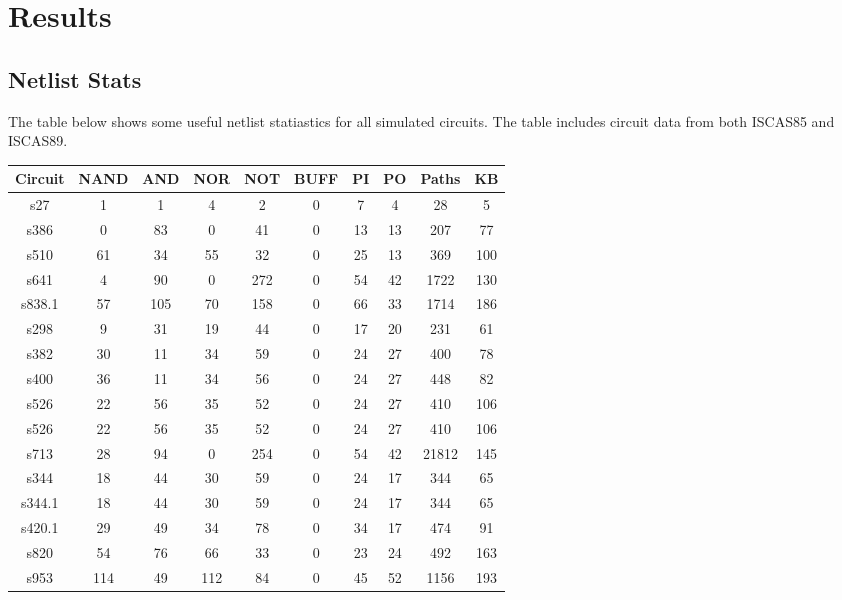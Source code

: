 \documentclass[a4paper,11pt]{article}
\begin{document}
\clearpage 

\section*{Results}

\subsection*{Netlist Stats}

The table below shows some useful netlist statiastics for all simulated circuits. The table includes circuit data from both ISCAS85 and ISCAS89.

\begin{center}
\begin{tabular}{||c c c c c c c c c c||}
\hline
Circuit & NAND & AND & NOR & NOT & BUFF & PI & PO & Paths & KB  \\ [0.5ex] 
\hline\hline
 s27 & 1 & 1 & 4 & 2 & 0 & 7 & 4 & 28 & 5 \\ 
\hline
 s386 & 0 & 83 & 0 & 41 & 0 & 13 & 13 & 207 & 77 \\ 
\hline
 s510 & 61 & 34 & 55 & 32 & 0 & 25 & 13 & 369 & 100 \\ 
\hline
 s641 & 4 & 90 & 0 & 272 & 0 & 54 & 42 & 1722 & 130 \\ 
\hline
 s838.1 & 57 & 105 & 70 & 158 & 0 & 66 & 33 & 1714 & 186 \\ 
\hline
 s298 & 9 & 31 & 19 & 44 & 0 & 17 & 20 & 231 & 61 \\ 
\hline
 s382 & 30 & 11 & 34 & 59 & 0 & 24 & 27 & 400 & 78 \\ 
\hline
 s400 & 36 & 11 & 34 & 56 & 0 & 24 & 27 & 448 & 82 \\ 
\hline
 s526 & 22 & 56 & 35 & 52 & 0 & 24 & 27 & 410 & 106 \\ 
\hline
 s526 & 22 & 56 & 35 & 52 & 0 & 24 & 27 & 410 & 106 \\ 
\hline
 s713 & 28 & 94 & 0 & 254 & 0 & 54 & 42 & 21812 & 145 \\ 
\hline
 s344 & 18 & 44 & 30 & 59 & 0 & 24 & 17 & 344 & 65 \\ 
\hline
 s344.1 & 18 & 44 & 30 & 59 & 0 & 24 & 17 & 344 & 65 \\ 
\hline
 s420.1 & 29 & 49 & 34 & 78 & 0 & 34 & 17 & 474 & 91 \\ 
\hline
 s820 & 54 & 76 & 66 & 33 & 0 & 23 & 24 & 492 & 163 \\ 
\hline
 s953 & 114 & 49 & 112 & 84 & 0 & 45 & 52 & 1156 & 193 \\ 
\hline

\end{tabular}
\end{center}
\end{document}
